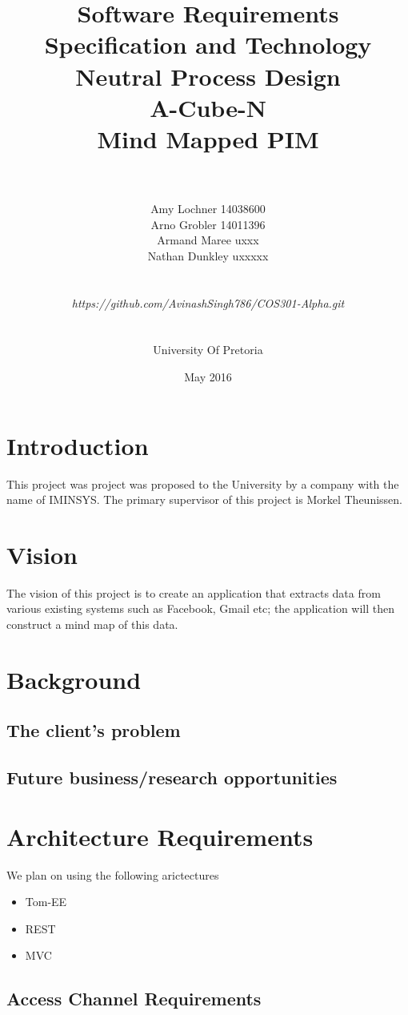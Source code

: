 \documentclass[a4paper]{article}
\title{\huge Software Requirements Specification and Technology Neutral Process Design
	\\A-Cube-N
	\\Mind Mapped PIM}
\author{\\\\Amy Lochner 14038600\\ Arno Grobler 14011396 \\
	Armand Maree uxxx\\ Nathan Dunkley uxxxxx \\

	\\
	\\\textit{https://github.com/AvinashSingh786/COS301-Alpha.git}
	\\
	\\
	\\ University Of Pretoria\\}
\date{May 2016}
\begin{document}
	
	\maketitle

	\newpage

	\tableofcontents
	\newpage
	
	\section{Introduction}
	This project was project was proposed to the University by a company with the name of IMINSYS. The primary supervisor of this project is Morkel Theunissen.

	
	\section{Vision}
	The vision of this project is to create an application that extracts data from various existing systems such as Facebook, Gmail etc; the application will then construct a mind map of this data.
	
	\section{Background}
	\subsection{The client's problem}

	
	\subsection{Future business/research opportunities}

	
	\section{Architecture Requirements}
    
    We plan on using the following arictectures
	\begin{itemize}
	    \item Tom-EE
	    \item REST 
	    \item MVC
	\end{itemize}
	
	\subsection{Access Channel Requirements}
\end{document}

